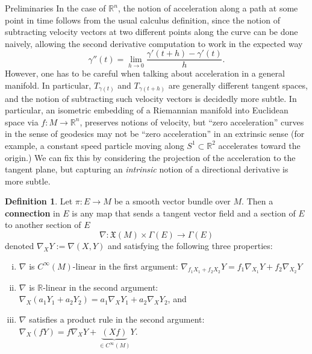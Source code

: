 \documentclass{article}
\newcommand{\fn}[3]{#1 \colon #2 \rightarrow #3}
\theoremstyle{definition}
\newtheorem{definition}{Definition}[section]
\theoremstyle{remark}
\begin{document}
\begin{section}{Preliminaries}
  In the case of $\mathbb R^n$, the notion of acceleration along a path at
  some point in time follows from the usual calculus definition, since the
  notion of subtracting
  velocity vectors at two different points along the curve can be done naively,
  allowing the second derivative computation to work in the expected way \[
    \gamma''(t) = \lim_{h \rightarrow 0} \frac{\gamma'(t + h) - \gamma'(t)}{h}.
  \] However, one has to be careful when talking about acceleration
  in a general manifold. In particular, $T_{\gamma(t)}$ and $T_{\gamma(t+h)}$ are
  generally different tangent spaces, and the notion of subtracting such velocity
  vectors is decidedly more subtle. In particular, an isometric embedding of a
  Riemannian manifold into Euclidean space via $\fn f M {\mathbb R^n}$,
  preserves notions of velocity, but ``zero acceleration'' curves in the sense of
  geodesics may not be ``zero acceleration'' in an extrinsic sense
  (for example, a constant speed particle moving along $S^1 \subset \mathbb R^2$
  accelerates toward the origin.)
  We can fix this by considering the projection of the acceleration to the
  tangent plane, but capturing an \textit{intrinsic} notion of a directional
  derivative is more subtle.
  \begin{definition}
    Let $\fn \pi E M$ be a smooth vector bundle over $M$. Then a \textbf{connection} in
    $E$ is any map that sends a tangent vector field and a section of $E$ to
    another section of $E$ \[
      \fn{\nabla}{\mathfrak X(M) \times \Gamma(E)}{\Gamma(E)}
    \] denoted $\nabla_XY := \nabla(X, Y)$ and satisfying the following three properties:
    \begin{enumerate}[(i)]
      \item $\nabla$ is $C^\infty(M)$-linear in the first argument:
        $\displaystyle\nabla_{f_1X_1 + f_2X_2}Y = f_1\nabla_{X_1}Y + f_2\nabla_{X_2}Y$
      \item $\nabla$ is $\mathbb R$-linear in the second argument:
        $\displaystyle\nabla_X(a_1Y_1 + a_2Y_2) = a_1\nabla_X Y_1 + a_2\nabla_XY_2$, and
      \item $\nabla$ satisfies a product rule in the second argument:
        $\displaystyle\nabla_X(fY) = f\nabla_{X}Y + \underbrace{(Xf)}_{\in C^\infty(M)}Y$.
    \end{enumerate}

\end{definition}
\end{section}
\end{document}
